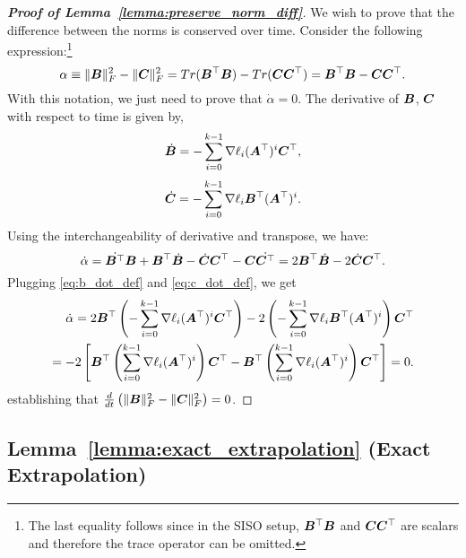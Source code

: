 \begin{proof}[\textbf{Proof of Lemma~\ref{lemma:preserve_norm_diff}}]
We wish to prove that the difference between the norms is conserved over time.
Consider the following expression:\footnote{The last equality follows since in the SISO setup, ${\bm{B}}^\top{\bm{B}}$ and ${\bm{C}}{\bm{C}}^\top$ are scalars and therefore the trace operator can be omitted.}
\begin{equation}
    \alpha \equiv \|{\bm{B}}\|_F^2-\|{\bm{C}}\|_F^2 = Tr({\bm{B}}^\top {\bm{B}}) - Tr({\bm{C}}{\bm{C}}^\top)={\bm{B}}^\top {\bm{B}} - {\bm{C}}{\bm{C}}^\top.
\end{equation}
With this notation, we just need to prove that $\dot{\alpha} = 0$.
The derivative of ${\bm{B}}$, ${\bm{C}}$ with respect to time is given by,
\begin{equation}
\label{eq:b_dot_def}
    \dot{{\bm{B}}}=-\sum_{i=0}^{k-1}\nabla \ell_i ({\bm{A}}^\top)^i {\bm{C}}^\top,
\end{equation}
\begin{equation}
\label{eq:c_dot_def}
\dot{{\bm{C}}} = -\sum_{i=0}^{k-1}\nabla \ell_i {\bm{B}}^\top ({\bm{A}}^\top)^i.
\end{equation}
%
Using the interchangeability of derivative and transpose, we have:
%
\begin{equation}
    \dot{\alpha} = \dot{{\bm{B}}^\top}{\bm{B}} + {\bm{B}}^\top \dot{{\bm{B}}} - \dot{{\bm{C}}}{\bm{C}}^\top - {\bm{C}} \dot{{\bm{C}}^\top} = 2{\bm{B}}^\top \dot{{\bm{B}}} -2\dot{{\bm{C}}} {\bm{C}}^\top.
\end{equation}
%
Plugging \eqref{eq:b_dot_def} and \eqref{eq:c_dot_def}, we get
\begin{align}
\dot{\alpha} = 2 {\bm{B}}^\top \left(- \sum_{i=0}^{k-1} \nabla \ell_i ({\bm{A}}^\top)^i {\bm{C}}^\top \right) -2\left(-\sum_{i=0}^{k-1}\nabla \ell_i {\bm{B}}^\top ({\bm{A}}^\top)^i\right) {\bm{C}}^\top \\
    = -2\left[ {\bm{B}}^\top \left( \sum_{i=0}^{k-1} \nabla \ell_i ({\bm{A}}^\top)^i \right){\bm{C}}^\top -{\bm{B}}^\top\left(\sum_{i=0}^{k-1}\nabla \ell_i  ({\bm{A}}^\top)^i\right) {\bm{C}}^\top \right] = 0.
\end{align}
establishing that $\frac{d}{dt}\left(\|{\bm{B}}\|_F^2-\|{\bm{C}}\|_F^2\right)=0$.

\end{proof}

\subsection{Lemma~\ref{lemma:exact_extrapolation} (Exact Extrapolation)}\label{sec:exact_extrapolation_proof}


